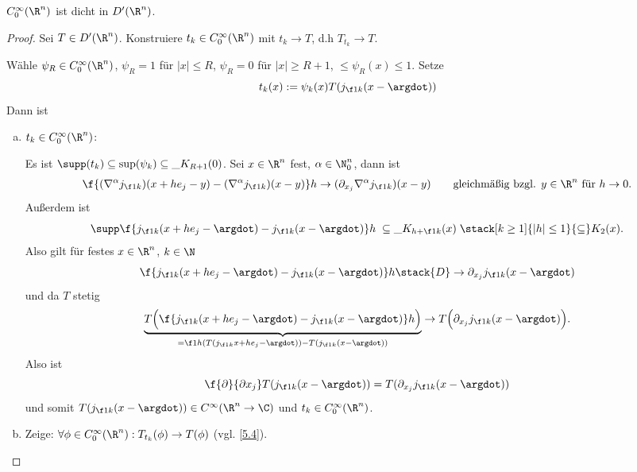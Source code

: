 \begin{st} \label{5.10}
	$C_0^\infty(\R^n)$ ist dicht in $D'(\R^n)$.
	\begin{proof}
		Sei $T \in D'(\R^n)$. Konstruiere $t_k \in C_0^\infty(\R^n)$ mit $t_k \to T$, d.h $T_{t_k} \to T$.

		Wähle $\psi_R \in C_0^\infty(\R^n)$, $\psi_R = 1$ für $|x| \le R$, $\psi_R = 0$ für $|x| \ge R + 1$, $  \le \psi_R(x) \le 1$.
		Setze
		\[
			t_k(x) := \psi_k (x) T(j_{\f 1k}(x - \argdot))
		\]
		Dann ist
		\begin{enumerate}[a)]
			\item
				$t_k \in C_0^\infty(\R^n)$:

				Es ist $\supp(t_k) \subset \sup(\psi_k) \subset \_{K_{R+1}(0)}$.
				Sei $x \in \R^n$ fest, $\alpha \in \N_0^n$, dann ist
				\begin{align*}
					\f {(\nabla^\alpha j_{\f 1k})(x+he_j - y) - (\nabla^\alpha j_{\f 1k})(x-y)}h
					\to (\partial_{x_j} \nabla^\alpha j_{\f 1k})(x-y) \qquad \text{gleichmäßig bzgl. $y\in \R^n$ für $h\to 0$.}
				\end{align*}
				Außerdem ist
				\[
					\supp \f{j_{\f 1k}(x+he_j - \argdot) - j_{\f 1k}(x-\argdot)}h
					\;\subset \_{K_{h+ \f 1k}(x)} \;
					\stack[k \ge 1]{|h| \le 1}{\subset} K_2(x).
				\]
				Also gilt für festes $x \in \R^n$, $k \in \N$
				\[
					\f {j_{\f 1k} (x+he_j - \argdot) - j_{\f 1k}(x-\argdot)}h
					\stack{D}\to \partial_{x_j} j_{\f 1k} (x-\argdot)
				\]
				und da $T$ stetig
				\[
					\underbrace{T \Big( \f {j_{\f 1k} (x+he_j - \argdot) - j_{\f 1k}(x-\argdot)}h \Big)}_{= \f 1h ( T(j_{\f 1k}x+he_j-\argdot)) - T(j_{\f 1k}(x-\argdot))}
					\to T \Big( \partial_{x_j} j_{\f 1k} (x-\argdot) \Big).
				\]
				Also ist
				\[
					\f{\partial}{\partial x_j} T (j_{\f 1k}(x-\argdot)) = T(\partial_{x_j} j_{\f 1k}(x-\argdot))
				\]
				und somit $T(j_{\f 1k}(x-\argdot)) \in C^\infty(\R^n \to \C)$ und $t_k \in C_0^\infty(\R^n)$.
			\item
				Zeige: $\forall \phi \in C_0^\infty(\R^n) : T_{t_k}(\phi) \to T(\phi)$ (vgl. \ref{5.4}).


\end{enumerate}
\end{proof}
\end{st}
